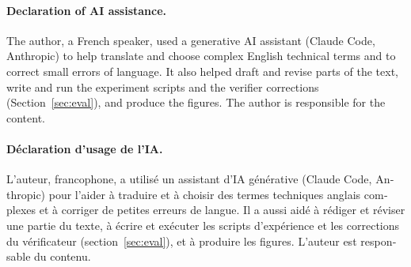 \documentclass[10pt,a4paper]{article}
\theoremstyle{tight}
\begin{document}
\paragraph{Declaration of AI assistance.} The author, a French speaker, used a generative AI assistant (Claude Code,
Anthropic) to help translate and choose complex English technical terms and to correct small errors of language. It
also helped draft and revise parts of the text, write and run the experiment scripts and the verifier corrections
(Section~\ref{sec:eval}), and produce the figures. The author is responsible for the content.

\begin{otherlanguage}{french}
\paragraph{Déclaration d'usage de l'IA.} L'auteur, francophone, a utilisé un assistant d'IA générative (Claude Code,
Anthropic) pour l'aider à traduire et à choisir des termes techniques anglais complexes et à corriger de petites
erreurs de langue. Il a aussi aidé à rédiger et réviser une partie du texte, à écrire et exécuter les scripts
d'expérience et les corrections du vérificateur (section~\ref{sec:eval}), et à produire les figures. L'auteur est
responsable du contenu.
\end{otherlanguage}
\end{document}

